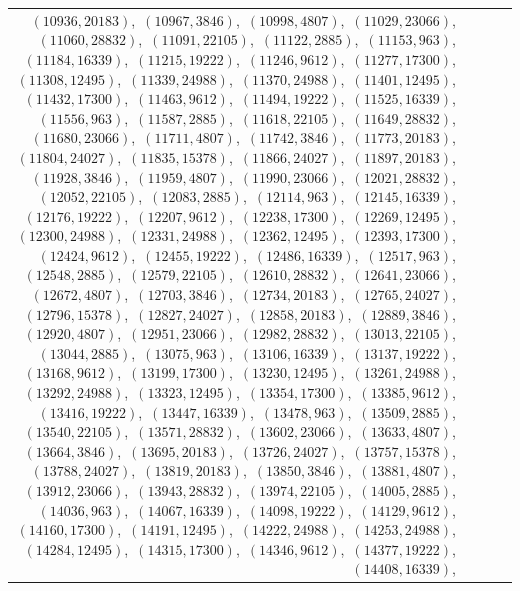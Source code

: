 \documentclass[11pt]{article}
\begin{document}
\begin{longtable}{@{}rrl>{\raggedright\arraybackslash}p{}@{}}
$(10936,20183)$,\allowbreak\ $(10967,3846)$,\allowbreak\ $(10998,4807)$,\allowbreak\ $(11029,23066)$,\allowbreak\ $(11060,28832)$,\allowbreak\ $(11091,22105)$,\allowbreak\ $(11122,2885)$,\allowbreak\ $(11153,963)$,\allowbreak\ $(11184,16339)$,\allowbreak\ $(11215,19222)$,\allowbreak\ $(11246,9612)$,\allowbreak\ $(11277,17300)$,\allowbreak\ $(11308,12495)$,\allowbreak\ $(11339,24988)$,\allowbreak\ $(11370,24988)$,\allowbreak\ $(11401,12495)$,\allowbreak\ $(11432,17300)$,\allowbreak\ $(11463,9612)$,\allowbreak\ $(11494,19222)$,\allowbreak\ $(11525,16339)$,\allowbreak\ $(11556,963)$,\allowbreak\ $(11587,2885)$,\allowbreak\ $(11618,22105)$,\allowbreak\ $(11649,28832)$,\allowbreak\ $(11680,23066)$,\allowbreak\ $(11711,4807)$,\allowbreak\ $(11742,3846)$,\allowbreak\ $(11773,20183)$,\allowbreak\ $(11804,24027)$,\allowbreak\ $(11835,15378)$,\allowbreak\ $(11866,24027)$,\allowbreak\ $(11897,20183)$,\allowbreak\ $(11928,3846)$,\allowbreak\ $(11959,4807)$,\allowbreak\ $(11990,23066)$,\allowbreak\ $(12021,28832)$,\allowbreak\ $(12052,22105)$,\allowbreak\ $(12083,2885)$,\allowbreak\ $(12114,963)$,\allowbreak\ $(12145,16339)$,\allowbreak\ $(12176,19222)$,\allowbreak\ $(12207,9612)$,\allowbreak\ $(12238,17300)$,\allowbreak\ $(12269,12495)$,\allowbreak\ $(12300,24988)$,\allowbreak\ $(12331,24988)$,\allowbreak\ $(12362,12495)$,\allowbreak\ $(12393,17300)$,\allowbreak\ $(12424,9612)$,\allowbreak\ $(12455,19222)$,\allowbreak\ $(12486,16339)$,\allowbreak\ $(12517,963)$,\allowbreak\ $(12548,2885)$,\allowbreak\ $(12579,22105)$,\allowbreak\ $(12610,28832)$,\allowbreak\ $(12641,23066)$,\allowbreak\ $(12672,4807)$,\allowbreak\ $(12703,3846)$,\allowbreak\ $(12734,20183)$,\allowbreak\ $(12765,24027)$,\allowbreak\ $(12796,15378)$,\allowbreak\ $(12827,24027)$,\allowbreak\ $(12858,20183)$,\allowbreak\ $(12889,3846)$,\allowbreak\ $(12920,4807)$,\allowbreak\ $(12951,23066)$,\allowbreak\ $(12982,28832)$,\allowbreak\ $(13013,22105)$,\allowbreak\ $(13044,2885)$,\allowbreak\ $(13075,963)$,\allowbreak\ $(13106,16339)$,\allowbreak\ $(13137,19222)$,\allowbreak\ $(13168,9612)$,\allowbreak\ $(13199,17300)$,\allowbreak\ $(13230,12495)$,\allowbreak\ $(13261,24988)$,\allowbreak\ $(13292,24988)$,\allowbreak\ $(13323,12495)$,\allowbreak\ $(13354,17300)$,\allowbreak\ $(13385,9612)$,\allowbreak\ $(13416,19222)$,\allowbreak\ $(13447,16339)$,\allowbreak\ $(13478,963)$,\allowbreak\ $(13509,2885)$,\allowbreak\ $(13540,22105)$,\allowbreak\ $(13571,28832)$,\allowbreak\ $(13602,23066)$,\allowbreak\ $(13633,4807)$,\allowbreak\ $(13664,3846)$,\allowbreak\ $(13695,20183)$,\allowbreak\ $(13726,24027)$,\allowbreak\ $(13757,15378)$,\allowbreak\ $(13788,24027)$,\allowbreak\ $(13819,20183)$,\allowbreak\ $(13850,3846)$,\allowbreak\ $(13881,4807)$,\allowbreak\ $(13912,23066)$,\allowbreak\ $(13943,28832)$,\allowbreak\ $(13974,22105)$,\allowbreak\ $(14005,2885)$,\allowbreak\ $(14036,963)$,\allowbreak\ $(14067,16339)$,\allowbreak\ $(14098,19222)$,\allowbreak\ $(14129,9612)$,\allowbreak\ $(14160,17300)$,\allowbreak\ $(14191,12495)$,\allowbreak\ $(14222,24988)$,\allowbreak\ $(14253,24988)$,\allowbreak\ $(14284,12495)$,\allowbreak\ $(14315,17300)$,\allowbreak\ $(14346,9612)$,\allowbreak\ $(14377,19222)$,\allowbreak\ $(14408,16339)$,\allowbreak\ 
\end{longtable}
\end{document}
